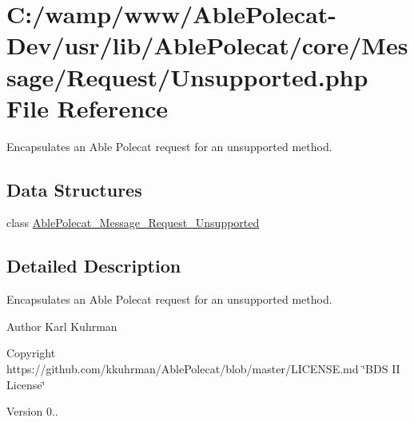 \hypertarget{_unsupported_8php}{}\section{C\+:/wamp/www/\+Able\+Polecat-\/\+Dev/usr/lib/\+Able\+Polecat/core/\+Message/\+Request/\+Unsupported.php File Reference}
\label{_unsupported_8php}


Encapsulates an Able Polecat request for an unsupported method.  


\subsection*{Data Structures}
\begin{DoxyCompactItemize}
\item 
class \hyperlink{class_able_polecat___message___request___unsupported}{Able\+Polecat\+\_\+\+Message\+\_\+\+Request\+\_\+\+Unsupported}
\end{DoxyCompactItemize}


\subsection{Detailed Description}
Encapsulates an Able Polecat request for an unsupported method. 

\begin{DoxyAuthor}{Author}
Karl Kuhrman 
\end{DoxyAuthor}
\begin{DoxyCopyright}{Copyright}
https\+://github.com/kkuhrman/\+Able\+Polecat/blob/master/\+L\+I\+C\+E\+N\+S\+E.\+md \char`\"{}\+B\+D\+S I\+I License\char`\"{} 
\end{DoxyCopyright}
\begin{DoxyVersion}{Version}
0.. 
\end{DoxyVersion}
